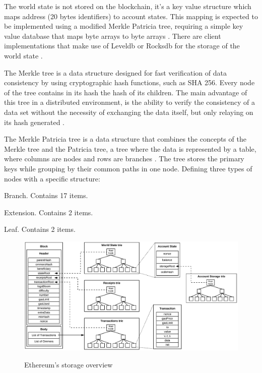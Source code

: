 \documentclass[
    article, 
    12pt,				%
	oneside,			%
	a4paper,			%
	chapter=TITLE,		%
	section=TITLE,		%
	english,			%
	english,				%
	sumario=tradicional
]{abntex2}
\begin{document}
The world state is not stored on the blockchain, it's a key value structure which maps address (20 bytes identifiers) to account states.
This mapping is expected to be implemented using a modified Merkle Patricia tree, requiring a simple key value database that maps byte arrays to byte arrays \cite{wood_ethereum_2021}.
There are client implementations that make use of Leveldb or Rocksdb for the storage of the world state \cite{ethereum_data_structure_jezek_2021}.

The Merkle tree is a data structure designed for fast verification of data consistency by using cryptographic hash functions, such as SHA 256. 
Every node of the tree contains in its hash the hash of its children.
The main advantage of this tree in a distributed environment, is the ability to verify the consistency of a data set without the necessity of exchanging the data itself, but only relaying on its hash generated \cite{ethereum_data_structure_jezek_2021}.

The Merkle Patricia tree is a data structure that combines the concepts of the Merkle tree and the Patricia tree, a tree where the data is represented by a table, where columns are nodes and rows are branches \cite{ethereum_data_structure_jezek_2021}.
The tree stores the primary keys while grouping by their common paths in one node.
Defining three types of nodes with a specific structure:

\begin{alineas}
    \item Branch. Contains 17 items.
    \item Extension. Contains 2 items.
    \item Leaf. Contains 2 items.
\end{alineas}


\begin{figure}[ht]
    \centering
    \caption{Ethereum's storage overview}
    \includegraphics[width=\textwidth]{images/ethereu_storage_overview.png}
    \label{fig:ethereum_storage_overview}
\end{figure}
\end{document}
